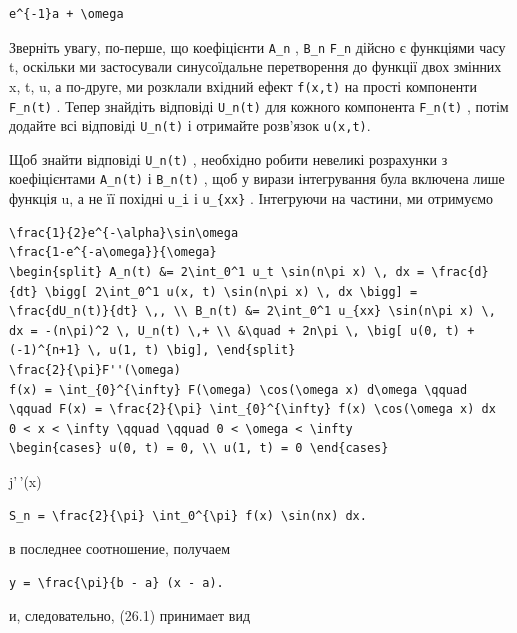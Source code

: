 \documentclass[
  ukrainian,
]{article}
\begin{document}
\begin{verbatim}
e^{-1}a + \omega
\end{verbatim}

Зверніть увагу, по-перше, що коефіцієнти \texttt{A\_n} , \texttt{B\_n}
\texttt{F\_n} дійсно є функціями часу t, оскільки ми застосували
синусоїдальне перетворення до функції двох змінних x, t, u, а по-друге,
ми розклали вхідний ефект \texttt{f(x,t)} на прості компоненти
\texttt{F\_n(t)} . Тепер знайдіть відповіді \texttt{U\_n(t)} для кожного
компонента \texttt{F\_n(t)} , потім додайте всі відповіді
\texttt{U\_n(t)} і отримайте розв'язок \texttt{u(x,t)}.

Щоб знайти відповіді \texttt{U\_n(t)} , необхідно робити невеликі
розрахунки з коефіцієнтами \texttt{A\_n(t)} і \texttt{B\_n(t)} , щоб у
вирази інтегрування була включена лише функція u, а не її похідні
\texttt{u\_i} і \texttt{u\_\{xx\}} . Інтегруючи на частини, ми отримуємо

\begin{verbatim}
\frac{1}{2}e^{-\alpha}\sin\omega
\frac{1-e^{-a\omega}}{\omega}
\begin{split} A_n(t) &= 2\int_0^1 u_t \sin(n\pi x) \, dx = \frac{d}{dt} \bigg[ 2\int_0^1 u(x, t) \sin(n\pi x) \, dx \bigg] = \frac{dU_n(t)}{dt} \,, \\ B_n(t) &= 2\int_0^1 u_{xx} \sin(n\pi x) \, dx = -(n\pi)^2 \, U_n(t) \,+ \\ &\quad + 2n\pi \, \big[ u(0, t) + (-1)^{n+1} \, u(1, t) \big], \end{split}
\frac{2}{\pi}F''(\omega)
f(x) = \int_{0}^{\infty} F(\omega) \cos(\omega x) d\omega \qquad \qquad F(x) = \frac{2}{\pi} \int_{0}^{\infty} f(x) \cos(\omega x) dx
0 < x < \infty \qquad \qquad 0 < \omega < \infty
\begin{cases} u(0, t) = 0, \\ u(1, t) = 0 \end{cases}
\end{verbatim}

j'\,'(x)

\begin{verbatim}
S_n = \frac{2}{\pi} \int_0^{\pi} f(x) \sin(nx) dx.
\end{verbatim}

в последнее соотношение, получаем

\begin{verbatim}
y = \frac{\pi}{b - a} (x - a).
\end{verbatim}

и, следовательно, (26.1) принимает вид
\end{document}
